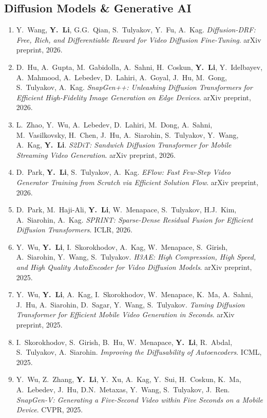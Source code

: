 \documentclass[11pt,letterpaper]{article}
\newcommand{\pub}[4]{%
    \item #1. \textit{#2}. #3, #4.
}
\begin{document}
\subsection*{Diffusion Models \& Generative AI}

\begin{enumerate}[resume]

\pub{Y.\ Wang, \textbf{Y.\ Li}, G.G.\ Qian, S.\ Tulyakov, Y.\ Fu, A.\ Kag}
    {Diffusion-DRF: Free, Rich, and Differentiable Reward for Video Diffusion Fine-Tuning}
    {arXiv preprint}{2026}

\pub{D.\ Hu, A.\ Gupta, M.\ Gabidolla, A.\ Sahni, H.\ Coskun, \textbf{Y.\ Li}, Y.\ Idelbayev, A.\ Mahmood, A.\ Lebedev, D.\ Lahiri, A.\ Goyal, J.\ Hu, M.\ Gong, S.\ Tulyakov, A.\ Kag}
    {SnapGen++: Unleashing Diffusion Transformers for Efficient High-Fidelity Image Generation on Edge Devices}
    {arXiv preprint}{2026}

\pub{L.\ Zhao, Y.\ Wu, A.\ Lebedev, D.\ Lahiri, M.\ Dong, A.\ Sahni, M.\ Vasilkovsky, H.\ Chen, J.\ Hu, A.\ Siarohin, S.\ Tulyakov, Y.\ Wang, A.\ Kag, \textbf{Y.\ Li}}
    {S2DiT: Sandwich Diffusion Transformer for Mobile Streaming Video Generation}
    {arXiv preprint}{2026}

\pub{D.\ Park, \textbf{Y.\ Li}, S.\ Tulyakov, A.\ Kag}
    {EFlow: Fast Few-Step Video Generator Training from Scratch via Efficient Solution Flow}
    {arXiv preprint}{2026}

\pub{D.\ Park, M.\ Haji-Ali, \textbf{Y.\ Li}, W.\ Menapace, S.\ Tulyakov, H.J.\ Kim, A.\ Siarohin, A.\ Kag}
    {SPRINT: Sparse-Dense Residual Fusion for Efficient Diffusion Transformers}
    {ICLR}{2026}

\pub{Y.\ Wu, \textbf{Y.\ Li}, I.\ Skorokhodov, A.\ Kag, W.\ Menapace, S.\ Girish, A.\ Siarohin, Y.\ Wang, S.\ Tulyakov}
    {H3AE: High Compression, High Speed, and High Quality AutoEncoder for Video Diffusion Models}
    {arXiv preprint}{2025}

\pub{Y.\ Wu, \textbf{Y.\ Li}, A.\ Kag, I.\ Skorokhodov, W.\ Menapace, K.\ Ma, A.\ Sahni, J.\ Hu, A.\ Siarohin, D.\ Sagar, Y.\ Wang, S.\ Tulyakov}
    {Taming Diffusion Transformer for Efficient Mobile Video Generation in Seconds}
    {arXiv preprint}{2025}

\pub{I.\ Skorokhodov, S.\ Girish, B.\ Hu, W.\ Menapace, \textbf{Y.\ Li}, R.\ Abdal, S.\ Tulyakov, A.\ Siarohin}
    {Improving the Diffusability of Autoencoders}
    {ICML}{2025}

\pub{Y.\ Wu, Z.\ Zhang, \textbf{Y.\ Li}, Y.\ Xu, A.\ Kag, Y.\ Sui, H.\ Coskun, K.\ Ma, A.\ Lebedev, J.\ Hu, D.N.\ Metaxas, Y.\ Wang, S.\ Tulyakov, J.\ Ren}
    {SnapGen-V: Generating a Five-Second Video within Five Seconds on a Mobile Device}
    {CVPR}{2025}


\end{enumerate}
\end{document}

